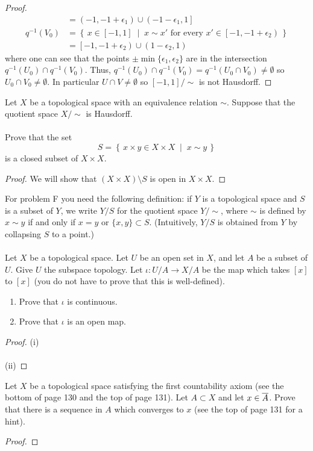 \begin{proof}
\begin{align*}
&=\left(-1,-1+\epsilon_1\right)\cup\left(-1-\epsilon_1,1\right]\\
q^{-1}(V_0)&=\left\{\,x\in[-1,1]\;\middle|\;
\text{$x\sim x'$ for every $x'\in\left[-1,-1+\epsilon_2\right)$}\,\right\}\\
&=\left[-1,-1+\epsilon_2\right)\cup\left(1-\epsilon_2,1\right)
\end{align*}
where one can see that the points
$\pm\min\{\epsilon_1,\epsilon_2\}$ are in the intersection
$q^{-1}(U_0)\cap q^{-1}\left(V_0\right)$. Thus,
$q^{-1}\left(U_0\right)\cap q^{-1}(V_0)=q^{-1}\left(U_0\cap
  V_0\right)\neq\emptyset$ so $U_0\cap V_0\neq\emptyset$. In
particular $U\cap V\neq\emptyset$ so $[-1,1]/{\sim}$ is not
Hausdorff.
\end{proof}
\newpage
\begin{problem}[E]
Let $X$ be a topological space with an equivalence relation
$\sim$. Suppose that the quotient space $X/\sim$ is Hausdorff.
\\\\
Prove that the set
\[
S=\left\{\,x\times y\in X\times X\;\middle|\;x\sim y\,\right\}
\]
is a closed subset of $X\times X$.
\end{problem}
\begin{proof}
We will show that $(X\times X)\setminus S$ is open in $X\times
X$.
\end{proof}
\newpage
\begin{problem}[F]
For problem F you need the following definition: if $Y$ is a
topological space and $S$ is a subset of $Y$, we write $Y/S$ for
the quotient space $Y/{\sim}$, where $\sim$ is defined by $x\sim y$
if and only if $x=y$ or $\{x,y\}\subset S$. (Intuitively, $Y/S$
is obtained from $Y$ by collapsing $S$ to a point.)
\\\\
Let $X$ be a topological space. Let $U$ be an open set in $X$,
and let $A$ be a subset of $U$. Give $U$ the subspace
topology. Let $\iota\colon U/A\to X/A$ be the map which takes
$[x]$ to $[x]$ (you do not have to prove that this is
well-defined).
\begin{enumerate}[noitemsep,label=(\roman*)]
\item Prove that $\iota$ is continuous.
\item Prove that $\iota$ is an open map.
\end{enumerate}
\end{problem}
\begin{proof}
(i)
\\\\
(ii)
\end{proof}
\newpage
\begin{problem}[G]
Let $X$ be a topological space satisfying the first countability
axiom (see the bottom of page 130 and the top of page 131). Let
$A\subset X$ and let $x\in\overline{A}$. Prove that there is a
sequence in $A$ which converges to $x$ (see the top of page 131
for a hint).
\end{problem}
\begin{proof}
\end{proof}


